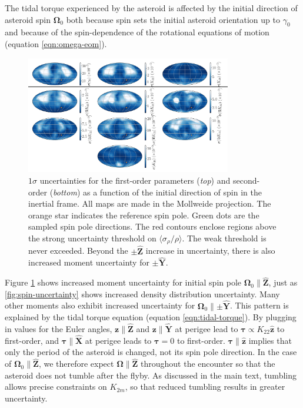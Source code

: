 \documentclass[fleqn,usenatbib]{mnras}
\renewcommand{\unit}[1]{\bm{\hat{#1}}}
\begin{document}
The tidal torque experienced by the asteroid is affected by the initial direction of asteroid spin $\bm \Omega_0$ both because spin sets the initial asteroid orientation up to $\gamma_0$ and because of the spin-dependence of the rotational equations of motion (equation \ref{eqn:omega-eom}).

\begin{figure}
  \centering
  \includegraphics[width=0.8\textwidth]{figs/spin-pole}
  \caption{$1\sigma$ uncertainties for the first-order parameters (\textit{top}) and second-order (\textit{bottom}) as a function of the initial direction of spin in the inertial frame. All maps are made in the Mollweide projection. The orange star indicates the reference spin pole. Green dots are the sampled spin pole directions. The red contours enclose regions above the strong uncertainty threshold on $\langle \sigma_\rho / \rho \rangle$. The weak threshold is never exceeded. Beyond the $\pm \unit Z$ increase in uncertainty, there is also increased moment uncertainty for $\pm \unit Y$.}
  \label{fig:scan-spin}
\end{figure}

Figure \ref{fig:scan-spin} shows increased moment uncertainty for initial spin pole $\bm \Omega_0 \parallel \unit Z$, just as \ref{fig:spin-uncertainty} shows increased density distribution uncertainty. Many other moments also exhibit increased uncertainty for $\bm \Omega_0 \parallel \pm \unit Y$. This pattern is explained by the tidal torque equation (equation \ref{eqn:tidal-torque}). By plugging in values for the Euler angles, $\bm z \parallel \unit Z$ and $\bm z \parallel \unit Y$ at perigee lead to $\bm \tau \propto K_{22} \unit z$ to first-order, and $\bm \tau \parallel \unit X$ at perigee leads to $\bm \tau = 0$ to first-order. $\bm \tau \parallel \unit z$ implies that only the period of the asteroid is changed, not its spin pole direction. In the case of $\bm \Omega_0 \parallel \unit Z$, we therefore expect $\bm \Omega \parallel \unit Z$ throughout the encounter so that the asteroid does not tumble after the flyby. As discussed in the main text, tumbling allows precise constraints on $K_{2m}$, so that reduced tumbling results in greater uncertainty.
\end{document}
